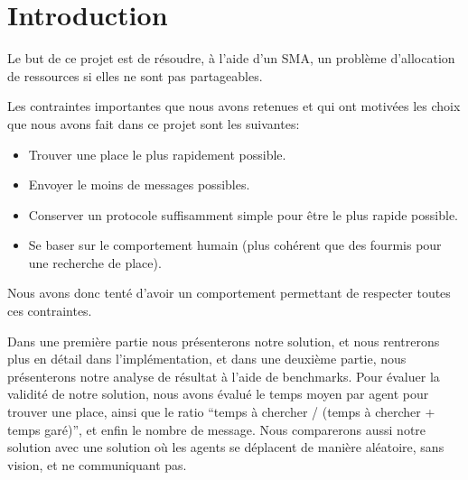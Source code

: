 
\section*{Introduction}
\label{sec:intro}

Le but de ce projet est de résoudre, à l'aide d'un SMA, un problème
d'allocation de ressources si elles ne sont pas partageables.

Les contraintes importantes que nous avons retenues et qui ont
motivées les choix que nous avons fait dans ce projet sont les
suivantes:

\begin{itemize}
\item Trouver une place le plus rapidement possible.
\item Envoyer le moins de messages possibles.
\item Conserver un protocole suffisamment simple pour être le plus
  rapide possible.
\item Se baser sur le comportement humain (plus cohérent que des
  fourmis pour une recherche de place).
\end{itemize}

Nous avons donc tenté d'avoir un comportement permettant de respecter
toutes ces contraintes.

Dans une première partie nous présenterons notre solution, et nous
rentrerons plus en détail dans l'implémentation, et dans une deuxième
partie, nous présenterons notre analyse de résultat à l'aide de
benchmarks. Pour évaluer la validité de notre solution, nous avons
évalué le temps moyen par agent pour trouver une place, ainsi que le
ratio ``temps à chercher / (temps à chercher + temps garé)'', et enfin
le nombre de message. Nous comparerons aussi notre solution avec une
solution où les agents se déplacent de manière aléatoire, sans vision,
et ne communiquant pas.

